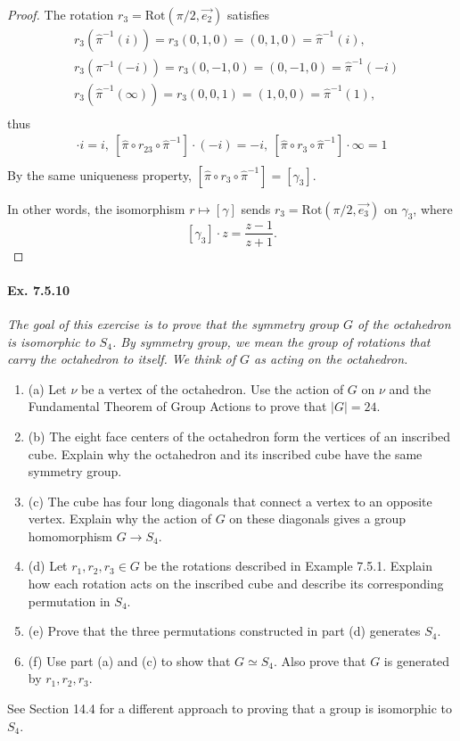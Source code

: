 \documentclass[11pt,a4paper]{article}
\newcommand{\be} {\begin{enumerate}}
\newcommand{\ee} {\end{enumerate}}
\begin{document}
\begin{proof}
The rotation $r_3 = \mathrm{Rot}(\pi/2, \overrightarrow{e_2})$ satisfies
\begin{align*}
&r_3(\hat{\pi}^{-1}(i)) =r_3(0,1,0) = (0,1,0) = \hat{\pi}^{-1}(i),\\
 &r_3(\pi^{-1}(-i))=r_3(0,-1,0) = (0,-1,0) = \hat{\pi}^{-1}(-i)\\
 &r_3(\hat{\pi}^{-1}(\infty))  = r_3(0,0,1) = (1,0,0)= \hat{\pi}^{-1}(1), \\
 \end{align*} thus 
 \begin{align*}
 [\hat{\pi} \circ r_3 \circ \hat{\pi}^{-1}] \cdot  i=i, \ [\hat{\pi} \circ r_23\circ \hat{\pi}^{-1}]\cdot (-i )= -i,\  [\hat{\pi} \circ r_3 \circ \hat{\pi}^{-1}]\cdot \infty = 1\\
 \end{align*}
 By the same uniqueness property, $[\hat{\pi} \circ r_3 \circ \hat{\pi}^{-1}]  = [\gamma_3]$.
 
In other words, the isomorphism $r\mapsto [\gamma]$ sends $r_3 = \mathrm{Rot}(\pi/2, \overrightarrow{e_3})$ on $\gamma_3$, where $$[\gamma_3]\cdot z = \frac{z-1}{z+1}.$$
\end{proof}



\paragraph{Ex. 7.5.10}

{\it The goal of this exercise is to prove that the symmetry group $G$ of the octahedron is isomorphic to $S_4$. By symmetry group, we mean the group of rotations that carry the octahedron to itself. We think of $G$ as acting on the octahedron.
\be
\item[(a)] Let $\nu$ be a vertex of the octahedron. Use the action of $G$ on $\nu$ and the Fundamental Theorem of Group Actions to prove that $|G| = 24$.
\item[(b)] The eight face centers of the octahedron form the vertices of an inscribed cube. Explain why the octahedron and its inscribed cube have the same symmetry group.
\item[(c)] The cube has four long diagonals that connect a vertex to an opposite vertex. Explain why the action of $G$ on these diagonals gives a group homomorphism $G \to S_4$.
\item[(d)] Let $r_1,r_2,r_3 \in G$ be the rotations described in Example 7.5.1. Explain how each rotation acts on the inscribed cube and describe its corresponding permutation in $S_4$.
\item[(e)] Prove that the three permutations constructed in part (d) generates $S_4$.
\item[(f)] Use part (a) and (c) to show that $G \simeq S_4$. Also prove that $G$ is generated by $r_1,r_2,r_3$.
\ee
See Section 14.4 for a different approach to proving that a group is isomorphic to $S_4$.
}
\end{document}
